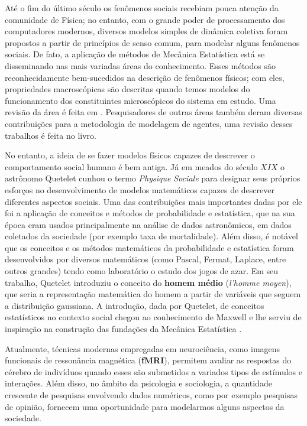 Até o fim do último século os fenômenos sociais recebiam pouca atenção
da comunidade de Física; no entanto, com o grande poder de processamento
dos computadores modernos, diversos modelos simples de dinâmica
coletiva foram propostos a partir de princípios de senso comum, para
modelar alguns fenômenos sociais. De fato, a aplicação de métodos de
Mecânica Estatística está se disseminando nas mais variadas áreas do
conhecimento. Esses métodos são reconhecidamente bem-sucedidos na descrição
de fenômenos físicos; com eles, propriedades macroscópicas são descritas
quando temos modelos do funcionamento dos constituintes microscópicos do
sistema em estudo. Uma revisão da área é feita em .
Pesquisadores de outras áreas também deram diversas contribuições para a
metodologia de modelagem de agentes, uma revisão desses trabalhos é feita no
livro\cite{Epstein2006,Epstein1996}.

No entanto, a ideia de se fazer modelos físicos capazes de descrever
o comportamento social humano  é bem antiga. Já em meados do século
$XIX$ o astrônomo Quetelet cunhou o termo \textit{Physique Sociale} para
designar seus próprios esforços no desenvolvimento de modelos matemáticos
capazes de descrever diferentes aspectos sociais\cite{Stewart1950}. Uma das
contribuições mais importantes dadas por ele foi a aplicação de conceitos
e métodos de probabilidade e estatística, que na sua época eram usados
principalmente na análise de dados astronômicos, em dados coletados da
sociedade (por exemplo taxa de mortalidade). Além disso, é notável que
os conceitos e os métodos matemáticos da probabilidade e estatística
foram desenvolvidos por diversos matemáticos (como Pascal, Fermat, Laplace,
entre outros grandes) tendo como laboratório o estudo dos jogos de azar. Em
seu trabalho, Quetelet introduziu o conceito do \textbf{homem médio}
(\textit{l'homme moyen}), que seria a representação matemática do homem a
partir de variáveis que seguem a distribuição gaussiana. A introdução,
dada por Quetelet, de conceitos estatísticos no contexto social chegou ao
conhecimento de Maxwell e lhe serviu de inspiração na construção das
fundações da Mecânica Estatística \cite{Finberg1992}.

Atualmente, técnicas modernas empregadas em neurociência, como imagens
funcionais de ressonância magnética (\textbf{fMRI}), permitem avaliar as
respostas do cérebro de indivíduos quando esses são submetidos a variados
tipos de estímulos e interações. Além disso, no âmbito da psicologia e
sociologia, a quantidade crescente de pesquisas envolvendo dados numéricos,
como por exemplo pesquisas de opinião, fornecem uma oportunidade para
modelarmos alguns aspectos da sociedade.

